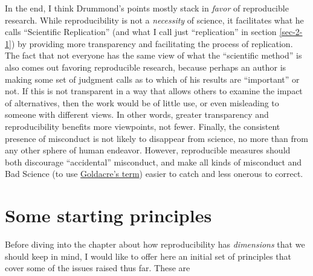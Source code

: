 \documentclass{book}
\begin{document}
In the end, I think Drummond's points mostly stack in \emph{favor} of reproducible research. While reproducibility is not a \emph{necessity} of science, it facilitates what he calls ``Scientific Replication'' (and what I call just ``replication'' in section \ref{sec-2-1}) by providing more transparency and facilitating the process of replication. The fact that not everyone has the same view of what the ``scientific method'' is also comes out favoring reproducible research, because perhaps an author is making some set of judgment calls as to which of his results are ``important'' or not. If this is not transparent in a way that allows others to examine the impact of alternatives, then the work would be of little use, or even misleading to someone with different views. In other words, greater transparency and reproducibility benefits more viewpoints, not fewer. Finally, the consistent presence of misconduct is not likely to disappear from science, no more than from any other sphere of human endeavor. However, reproducible measures should both discourage ``accidental'' misconduct, and make all kinds of misconduct and Bad Science (to use \href{http://www.badscience.net/}{Goldacre's term}) easier to catch and less onerous to correct.
\section{Some starting principles}
\label{sec-2-5}

Before diving into the chapter about how reproducibility has \emph{dimensions} that we should keep in mind, I would like to offer here an initial set of principles that cover some of the issues raised thus far.  These are 
\end{document}
